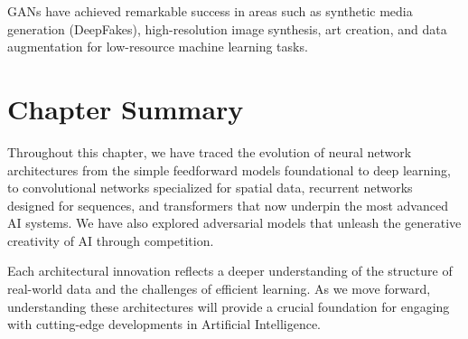 \documentclass{book}
\begin{document}
GANs have achieved remarkable success in areas such as synthetic media 
generation (DeepFakes), high-resolution image synthesis, art creation, and data 
augmentation for low-resource machine learning tasks.

\section{Chapter Summary}

Throughout this chapter, we have traced the evolution of neural network 
architectures from the simple feedforward models foundational to deep learning, 
to convolutional networks specialized for spatial data, recurrent networks 
designed for sequences, and transformers that now underpin the most advanced AI 
systems. We have also explored adversarial models that unleash the generative 
creativity of AI through competition.

Each architectural innovation reflects a deeper understanding of the structure 
of real-world data and the challenges of efficient learning. As we move forward, 
understanding these architectures will provide a crucial foundation for engaging 
with cutting-edge developments in Artificial Intelligence.
\end{document}
